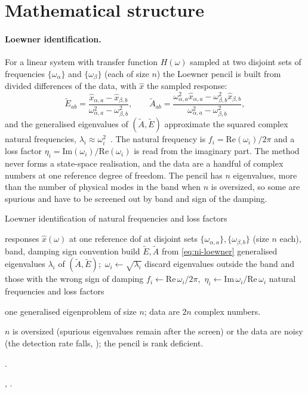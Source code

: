 \section{Mathematical structure}\label{sec:ni-math}

\paragraph{Loewner identification.}
For a linear system with transfer function $H(\omega)$ sampled at two disjoint sets of frequencies $\{\omega_\alpha\}$ and $\{\omega_\beta\}$ (each of size $n$) the Loewner pencil is built from divided differences of the data, with $\hat x$ the sampled response:
\begin{equation}\label{eq:ni-loewner}
\tilde E_{ab}=\frac{\hat x_{\alpha,a}-\hat x_{\beta,b}}{\omega_{\alpha,a}^2-\omega_{\beta,b}^2},\qquad
\tilde A_{ab}=\frac{\omega_{\alpha,a}^2\hat x_{\alpha,a}-\omega_{\beta,b}^2\hat x_{\beta,b}}{\omega_{\alpha,a}^2-\omega_{\beta,b}^2},
\end{equation}
and the generalised eigenvalues of $(\tilde A,\tilde E)$ approximate the squared complex natural frequencies, $\lambda_i\approx\omega_i^2$~\cite{mayo2007loewner,liu2026fsi}. The natural frequency is $f_i=\mathrm{Re}(\omega_i)/2\pi$ and a loss factor $\eta_i=\mathrm{Im}(\omega_i)/\mathrm{Re}(\omega_i)$ is read from the imaginary part. The method never forms a state-space realisation, and the data are a handful of complex numbers at one reference degree of freedom. The pencil has $n$ eigenvalues, more than the number of physical modes in the band when $n$ is oversized, so some are spurious and have to be screened out by band and sign of the damping.

\begin{algbox}{Loewner identification of natural frequencies and loss factors}
\begin{pseudo}
\Require responses $\hat x(\omega)$ at one reference dof at disjoint sets $\{\omega_{\alpha,a}\},\{\omega_{\beta,b}\}$ (size $n$ each), band, damping sign convention
\State build $\tilde E,\tilde A$ from \eqref{eq:ni-loewner}
\State generalised eigenvalues $\lambda_i$ of $(\tilde A,\tilde E)$;\ $\omega_i\gets\sqrt{\lambda_i}$
\State discard eigenvalues outside the band and those with the wrong sign of damping 
\State $f_i\gets\mathrm{Re}\,\omega_i/2\pi$,\ $\eta_i\gets\mathrm{Im}\,\omega_i/\mathrm{Re}\,\omega_i$
\Ensure natural frequencies and loss factors
\end{pseudo}
\begin{algdet}
\item[Cost] one generalised eigenproblem of size $n$; data are $2n$ complex numbers.
\item[Fails when] $n$ is oversized (spurious eigenvalues remain after the screen) or the data are noisy (the detection rate falls, ); the pencil is rank deficient.
\item[Code] .
\item[Verified in] , .
\end{algdet}
\end{algbox}

